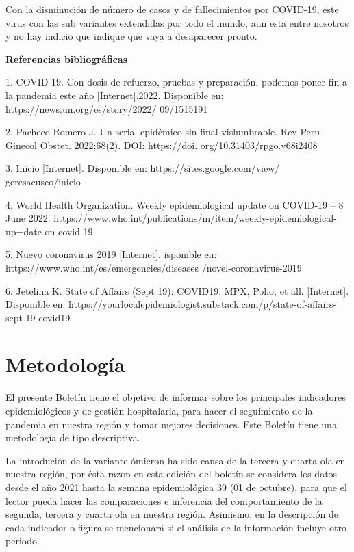 \documentclass[12pt,a4paper,openany]{book}
\begin{document}
Con la disminución de número de casos y de fallecimientos por COVID-19, este virus con las sub variantes extendidas por todo el mundo, aun esta entre nosotros y no hay indicio que indique que vaya a desaparecer pronto.

 


\textbf{Referencias bibliográficas}

1.	COVID-19. Con dosis de refuerzo, pruebas y preparación, podemos poner fin a la pandemia este año [Internet].2022. Disponible en: https://news.un.org/es/story/2022/
09/1515191

2.	Pacheco-Romero J. Un serial epidémico sin final vislumbrable. Rev Peru Ginecol Obstet. 2022;68(2). DOI: https://doi. org/10.31403/rpgo.v68i2408

3.	Inicio [Internet]. Disponible en: https://sites.google.com/view/
geresacusco/inicio

4.	World Health Organization. Weekly epidemiological update on COVID-19 – 8 June 2022. https://www.who.int/publications/m/item/weekly-epidemiological-up¬date-on-covid-19.

5.	Nuevo coronavirus 2019 [Internet]. isponible en: https://www.who.int/es/emergencies/diseases
/novel-coronavirus-2019

6.	Jetelina K. State of Affairs (Sept 19): COVID19, MPX, Polio, et all. [Internet]. Disponible en: https://yourlocalepidemiologist.substack.com/p/state-of-affairs-sept-19-covid19


	
		
	
	\clearpage	
	\section*{Metodología}
	
	
	
	\noindent El presente Boletín tiene el objetivo de informar sobre los principales indicadores epidemiológicos y
	de gestión hospitalaria, para hacer el seguimiento de la pandemia en nuestra región y tomar mejores decisiones. Este Boletín tiene una metodología de tipo descriptiva.
	
	La introdución de la variante ómicron ha sido causa de la tercera y cuarta ola en nuestra región, por ésta razon en esta edición del boletín se considera los datos desde el año 2021 hasta la
	semana epidemiológica  39 (01 de octubre), para que el lector pueda hacer las comparaciones
	e inferencia del comportamiento de la segunda, tercera y cuarta ola en nuestra región. Asimismo, en la descripción de cada indicador o figura se mencionará si el análisis de
	la información incluye otro periodo.
	
\end{document}
